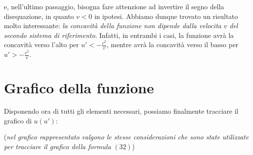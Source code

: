 \documentclass{article}
\begin{document}
e, nell'ultimo passaggio, bisogna fare attenzione
ad invertire il segno della disequazione, in quanto
\(v < 0\) in ipotesi. Abbiamo dunque trovato un risultato
molto interessante: \textit{la concavità della funzione
non dipende dalla velocita \(v\) del secondo sistema di
riferimento}. Infatti, in entrambi i casi, la funzione
avrà la concavità verso l'alto per \(u' < - \frac{c^2}{v}\),
mentre avrà la concavità verso il basso per \(u' > - \frac{c^2}{v}\).

\section{Grafico della funzione}
Disponendo ora di tutti gli elementi necessari,
possiamo finalmente tracciare il grafico di \(u(u')\):

\begin{center}
\end{center}

(\textit{nel grafico rappresentato valgono le stesse
considerazioni che sono state utilizzate per
tracciare il grafico della formula \((32)\)})\hfill\break
\end{document}
